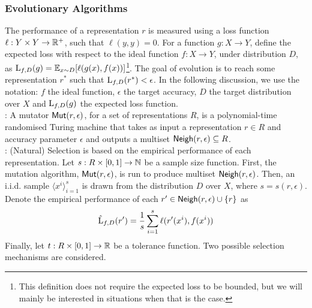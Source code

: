 \subsubsection*{Evolutionary Algorithms}

The performance of a representation $r$ is measured using a loss function $\ell
: Y \times Y \rightarrow \mathbb{R}^+$, such that $\ell(y, y) = 0$. For a function
$g : X \rightarrow Y$, define the expected loss with respect to the ideal
function $f : X \rightarrow Y$, under distribution $D$, as $\mathrm{L}_{f, D}(g) =
\mathbb{E}_{x \sim D}[\ell(g(x), f(x))]$\footnote{This definition does not require the
expected loss to be bounded, but we will mainly be interested in situations when
that is the case.}. The goal of evolution is to reach some representation $r^*$
such that $\mathrm{L}_{f, D}(r^*) < \epsilon$. In the following discussion, we use
the notation: $f$ the ideal function, $\epsilon$ the target accuracy, $D$ the
target distribution over $X$ and $\mathrm{L}_{f, D}(g)$ the expected loss function.  \medskip \\
%
: A mutator $\mathsf{Mut}(r, \epsilon)$, for a set of representations $R$, is
a polynomial-time randomised Turing machine that takes as input a representation
$r \in R$ and accuracy parameter $\epsilon$ and outputs a multiset $\mathsf{Neigh}(r,
\epsilon) \subseteq R$. \medskip \\
%
: (Natural) Selection is based on the empirical performance
of each representation. Let $s : R \times [0, 1] \rightarrow \mathbb{N}$ be a
sample size function. First, the mutation algorithm, $\mathsf{Mut}(r, \epsilon)$, is run
to produce multiset $\mathsf{Neigh}(r, \epsilon)$. Then, an i.i.d. sample $\langle x^i
\rangle_{i=1}^s$ is drawn from the distribution $D$ over $X$, where $s = s(r,
\epsilon)$.  Denote the empirical performance of each $r^\prime \in \mathsf{Neigh}(r,
\epsilon) \cup \{r \}$ as
%
\[ \hat{\mathrm{L}}_{f, D}(r^\prime) = \frac{1}{s}\sum_{i=1}^s \ell(r^\prime(x^i),
f(x^i)) \]
%
Finally, let $t : R \times [0, 1] \rightarrow \mathbb{R}$ be a tolerance function.
Two possible selection mechanisms are considered.
